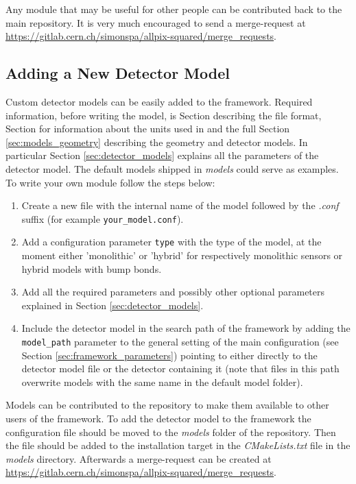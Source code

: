 Any module that may be useful for other people can be contributed back to the main repository. It is very much encouraged to send a merge-request at \url{https://gitlab.cern.ch/simonspa/allpix-squared/merge_requests}.

\subsection{Adding a New Detector Model}
\label{sec:adding_detector_model}
Custom detector models can be easily added to the framework. Required information, before writing the model, is Section \label{sec:config_file_format} describing the file format, Section \label{sec:config_values} for information about the units used in \apsq and the full Section \ref{sec:models_geometry} describing the geometry and detector models. In particular Section \ref{sec:detector_models} explains all the parameters of the detector model. The default models shipped in \textit{models} could serve as examples. To write your own module follow the steps below:
\begin{enumerate}
\item Create a new file with the internal name of the model followed by the \textit{.conf} suffix (for example \texttt{your\_model.conf}).
\item Add a configuration parameter \texttt{type} with the type of the model, at the moment either 'monolithic' or 'hybrid' for respectively monolithic sensors or hybrid models with bump bonds.
\item Add all the required parameters and possibly other optional parameters explained in Section \ref{sec:detector_models}.
\item Include the detector model in the search path of the framework by adding the \texttt{model\_path} parameter to the general setting of the main configuration (see Section \ref{sec:framework_parameters}) pointing to either directly to the detector model file or the detector containing it (note that files in this path overwrite models with the same name in the default model folder). 
\end{enumerate}

Models can be contributed to the repository to make them available to other users of the framework. To add the detector model to the framework the configuration file should be moved to the \textit{models} folder of the repository. Then the file should be added to the installation target in the \textit{CMakeLists.txt} file in the \textit{models} directory. Afterwards a merge-request can be created at \url{https://gitlab.cern.ch/simonspa/allpix-squared/merge_requests}.
